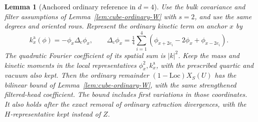 \documentclass[11pt]{article}
\newtheorem{lemma}[theorem]{Lemma}
\theoremstyle{definition}
\begin{document}
\begin{lemma}[Anchored ordinary reference in \(d=4\)]
\label{lem:cube-ordinary-W-d4}
Use the bulk covariance and filter assumptions of
Lemma~\ref{lem:cube-ordinary-W} with \(s=2\), and use the same
degrees and oriented rows. Represent the ordinary kinetic term
on anchor \(x\) by
\begin{equation}
 k_x^{\mathrm a}(\phi)=-\phi_x\Delta_{\mathrm c}\phi_x,\qquad
 \Delta_{\mathrm c}\phi_x
   =\tfrac14\sum_{i=1}^4
     (\phi_{x+2e_i}-2\phi_x+\phi_{x-2e_i}).
\end{equation}
The quadratic Fourier coefficient of its spatial sum is
\(|k|^2\). Keep the mass and kinetic moments in the local
representatives \(\phi_x^2,k_x^{\mathrm a}\), with the
prescribed quartic and vacuum also kept. Then the ordinary
remainder \((1-\mathrm{Loc})X_S(U)\) has the bilinear bound of
Lemma~\ref{lem:cube-ordinary-W}, with the same strengthened
filtered-head coefficient. The bound includes first variations
in those coordinates. It also holds after the exact removal
of ordinary extraction divergences, with the \(H\)-representative
kept instead of \(Z\).
\end{lemma}
\end{document}
